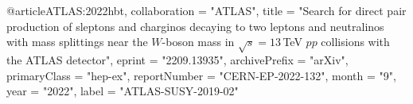 @article{ATLAS:2022hbt,
    collaboration = "ATLAS",
    title = "{Search for direct pair production of sleptons and charginos decaying to two leptons and neutralinos with mass splittings near the $W$-boson mass in ${\sqrt{s}=13\,}$TeV $pp$ collisions with the ATLAS detector}",
    eprint = "2209.13935",
    archivePrefix = "arXiv",
    primaryClass = "hep-ex",
    reportNumber = "CERN-EP-2022-132",
    month = "9",
    year = "2022",
    label = "ATLAS-SUSY-2019-02"
}

